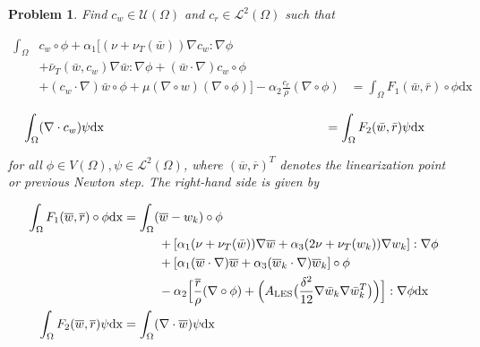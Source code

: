 \documentclass[a4paper, 11pt, twoside]{article}
\newtheorem{problem}{Problem}[section]
\begin{document}
\begin{problem}
Find $c_w \in \mathcal{U}(\Omega)$ and $c_r \in \mathcal{L}^2(\Omega)$ such that 

\begin{align}
\int_{\Omega} &c_w \circ \phi + \alpha_1\Big[(\nu + \nu_T(\bar{w})) \nabla c_w : \nabla \phi \nonumber \\ &+ \bar{\nu}_T(\bar{w},c_w)\nabla\bar{w} : \nabla \phi + (\bar{w} \cdot \nabla)c_w \circ \phi \nonumber \\ &+ (c_w \cdot \nabla)\bar{w} \circ \phi + \mu(\nabla \circ w)(\nabla \circ \phi) \Big] - \alpha_2\frac{c_r}{\rho}(\nabla \circ \phi) 
 &= \int_{\Omega} F_1(\bar{w},\bar{r}) \circ \phi \mathrm{dx}
\end{align}

\begin{equation}
\hspace{-0.5cm}\int_{\Omega} (\nabla \cdot c_w) \psi \mathrm{dx} \hspace{6.2cm}= \int_{\Omega} F_2(\bar{w},\bar{r}) \psi\mathrm{dx}
\end{equation}

for all $\phi \in V(\Omega),\psi \in \mathcal{L}^2(\Omega)$, where $(\overline{w},\overline{r})^T$ denotes the linearization point or previous Newton step. The right-hand side is given by

\begin{align}
\int_{\Omega} F_1(\overline{w},\overline{r}) \circ \phi \mathrm{dx} &= \int_{\Omega} (\overline{w} - w_k) \circ \phi \\ & \hspace{1.0cm} + [\alpha_1(\nu + \nu_T(\bar{w}))\nabla\overline{w} + \alpha_3(2\nu + \nu_T(w_k)) \nabla w_k] : \nabla \phi \nonumber \\  & \hspace{1.0cm} + [\alpha_1 (\overline{w} \cdot \nabla) \overline{w} + \alpha_3 (\overline{w}_k \cdot \nabla) \overline{w}_k] \circ \phi \nonumber \\ & \hspace{1.0cm} -\alpha_2\Big[ \frac{\overline{r}}{\rho} (\nabla \circ \phi)  + \Big(A_{\mathrm{LES}}\big(\frac{\delta^2}{12}\nabla \bar{w}_k \nabla \bar{w}_k^T\big)\Big)\Big] : \nabla \phi\mathrm{dx} \\ \int_{\Omega} F_2(\overline{w},\overline{r})\psi \mathrm{dx} &= \int_{\Omega} (\nabla \cdot \overline{w})\psi \mathrm{dx}
\end{align}
\end{problem}
\end{document}
